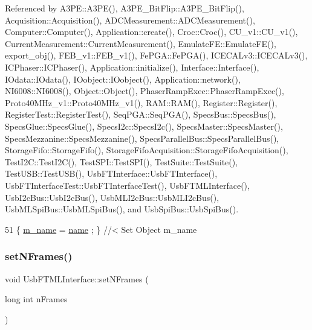 Referenced by A3\+P\+E\+::\+A3\+P\+E(), A3\+P\+E\+\_\+\+Bit\+Flip\+::\+A3\+P\+E\+\_\+\+Bit\+Flip(), Acquisition\+::\+Acquisition(), A\+D\+C\+Measurement\+::\+A\+D\+C\+Measurement(), Computer\+::\+Computer(), Application\+::create(), Croc\+::\+Croc(), C\+U\+\_\+v1\+::\+C\+U\+\_\+v1(), Current\+Measurement\+::\+Current\+Measurement(), Emulate\+F\+E\+::\+Emulate\+F\+E(), export\+\_\+obj(), F\+E\+B\+\_\+v1\+::\+F\+E\+B\+\_\+v1(), Fe\+P\+G\+A\+::\+Fe\+P\+G\+A(), I\+C\+E\+C\+A\+Lv3\+::\+I\+C\+E\+C\+A\+Lv3(), I\+C\+Phaser\+::\+I\+C\+Phaser(), Application\+::initialize(), Interface\+::\+Interface(), I\+Odata\+::\+I\+Odata(), I\+Oobject\+::\+I\+Oobject(), Application\+::network(), N\+I6008\+::\+N\+I6008(), Object\+::\+Object(), Phaser\+Ramp\+Exec\+::\+Phaser\+Ramp\+Exec(), Proto40\+M\+Hz\+\_\+v1\+::\+Proto40\+M\+Hz\+\_\+v1(), R\+A\+M\+::\+R\+A\+M(), Register\+::\+Register(), Register\+Test\+::\+Register\+Test(), Seq\+P\+G\+A\+::\+Seq\+P\+G\+A(), Specs\+Bus\+::\+Specs\+Bus(), Specs\+Glue\+::\+Specs\+Glue(), Specs\+I2c\+::\+Specs\+I2c(), Specs\+Master\+::\+Specs\+Master(), Specs\+Mezzanine\+::\+Specs\+Mezzanine(), Specs\+Parallel\+Bus\+::\+Specs\+Parallel\+Bus(), Storage\+Fifo\+::\+Storage\+Fifo(), Storage\+Fifo\+Acquisition\+::\+Storage\+Fifo\+Acquisition(), Test\+I2\+C\+::\+Test\+I2\+C(), Test\+S\+P\+I\+::\+Test\+S\+P\+I(), Test\+Suite\+::\+Test\+Suite(), Test\+U\+S\+B\+::\+Test\+U\+S\+B(), Usb\+F\+T\+Interface\+::\+Usb\+F\+T\+Interface(), Usb\+F\+T\+Interface\+Test\+::\+Usb\+F\+T\+Interface\+Test(), Usb\+F\+T\+M\+L\+Interface(), Usb\+I2c\+Bus\+::\+Usb\+I2c\+Bus(), Usb\+M\+L\+I2c\+Bus\+::\+Usb\+M\+L\+I2c\+Bus(), Usb\+M\+L\+Spi\+Bus\+::\+Usb\+M\+L\+Spi\+Bus(), and Usb\+Spi\+Bus\+::\+Usb\+Spi\+Bus().


\begin{DoxyCode}
51 \{ \hyperlink{classObject_a8b83c95c705d2c3ba0d081fe1710f48d}{m\_name}  = \hyperlink{classObject_a300f4c05dd468c7bb8b3c968868443c1}{name}  ; \} \textcolor{comment}{//< Set Object m\_name}
\end{DoxyCode}
\mbox{\label{classUsbFTMLInterface_a3a0a9d323631790c2db210fdcc85e89b}} 
\subsubsection{\texorpdfstring{set\+N\+Frames()}{setNFrames()}}
{\footnotesize\ttfamily void Usb\+F\+T\+M\+L\+Interface\+::set\+N\+Frames (\begin{DoxyParamCaption}\item[{long int}]{n\+Frames }\end{DoxyParamCaption})\hspace{0.3cm}{\ttfamily [inline]}}

